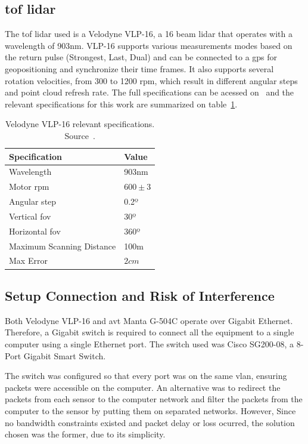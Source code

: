 \subsection{\ac{tof} \ac{lidar}}
The \ac{tof} \ac{lidar} used is a Velodyne VLP-16\texttrademark, a 16 beam \ac{lidar} that operates with a wavelength of 903nm. VLP-16 supports various measurements modes based on the return pulse (Strongest, Last, Dual) and can be connected to a \ac{gps} for geopositioning and synchronize their time frames. It also supports several rotation velocities, from 300 to 1200 \ac{rpm}, which result in different angular steps and point cloud refresh rate. The full specifications can be acessed on~\cite{VLP16} and the relevant specifications for this work are summarized on table~\ref{tab:vlp16-specs}.

\begin{table}[H]
	\renewcommand{\arraystretch}{1.2}
	\centering
	\begin{tabular}{@{}p{8.3cm}l@{}}
		\toprule
		Specification & Value \\ \midrule
		Wavelength    & 903nm \\
		Motor \acs{rpm} & $600 \pm 3$ \\
		Angular step & 0.2º \\
		Vertical \ac{fov} & 30º \\
		Horizontal \ac{fov} & 360º \\
		Maximum Scanning Distance & 100m \\
		Max Error & $2 cm$ \\
		\bottomrule
	\end{tabular}
	\caption{Velodyne VLP-16 relevant specifications. Source~\cite{VLP16}.}
	\label{tab:vlp16-specs}
\end{table}


\subsection{Setup Connection and Risk of Interference}
Both Velodyne VLP-16 and \ac{avt} Manta G-504C operate over Gigabit Ethernet. Therefore, a Gigabit switch is required to connect all the equipment to a single computer using a single Ethernet port. The switch used was Cisco SG200-08, a 8-Port Gigabit Smart Switch. 

The switch was configured so that every port was on the same \ac{vlan}, ensuring packets were accessible on the computer. An alternative was to redirect the packets from each sensor to the computer network and filter the packets from the computer to the sensor by putting them on separated networks. However, Since no bandwidth constraints existed and packet delay or loss ocurred, the solution chosen was the former, due to its simplicity. 

